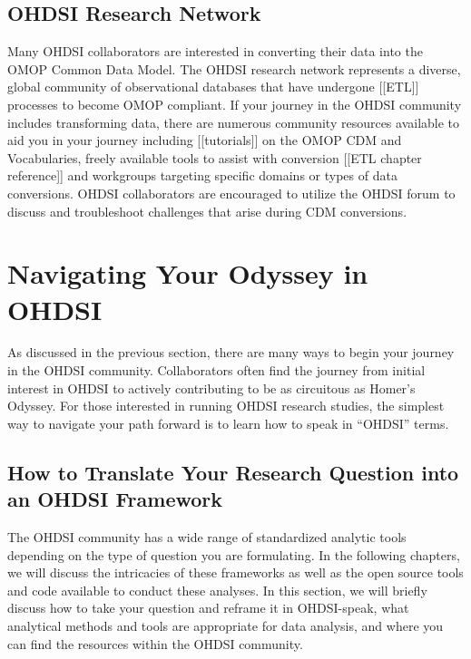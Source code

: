\documentclass[11pt]{book}
\theoremstyle{definition}
\theoremstyle{definition}
\theoremstyle{definition}
\theoremstyle{remark}
\begin{document}
\hypertarget{ohdsi-research-network}{%
\subsection{OHDSI Research Network}\label{ohdsi-research-network}}

Many OHDSI collaborators are interested in converting their data into the OMOP Common Data Model. The OHDSI research network represents a diverse, global community of observational databases that have undergone {[}{[}ETL{]}{]} processes to become OMOP compliant. If your journey in the OHDSI community includes transforming data, there are numerous community resources available to aid you in your journey including {[}{[}tutorials{]}{]} on the OMOP CDM and Vocabularies, freely available tools to assist with conversion {[}{[}ETL chapter reference{]}{]} and workgroups targeting specific domains or types of data conversions. OHDSI collaborators are encouraged to utilize the OHDSI forum to discuss and troubleshoot challenges that arise during CDM conversions.

\hypertarget{navigating-your-odyssey-in-ohdsi}{%
\section{Navigating Your Odyssey in OHDSI}\label{navigating-your-odyssey-in-ohdsi}}

As discussed in the previous section, there are many ways to begin your journey in the OHDSI community. Collaborators often find the journey from initial interest in OHDSI to actively contributing to be as circuitous as Homer's Odyssey. For those interested in running OHDSI research studies, the simplest way to navigate your path forward is to learn how to speak in ``OHDSI'' terms.

\hypertarget{how-to-translate-your-research-question-into-an-ohdsi-framework}{%
\subsection{How to Translate Your Research Question into an OHDSI Framework}\label{how-to-translate-your-research-question-into-an-ohdsi-framework}}

The OHDSI community has a wide range of standardized analytic tools depending on the type of question you are formulating. In the following chapters, we will discuss the intricacies of these frameworks as well as the open source tools and code available to conduct these analyses. In this section, we will briefly discuss how to take your question and reframe it in OHDSI-speak, what analytical methods and tools are appropriate for data analysis, and where you can find the resources within the OHDSI community.
\end{document}
